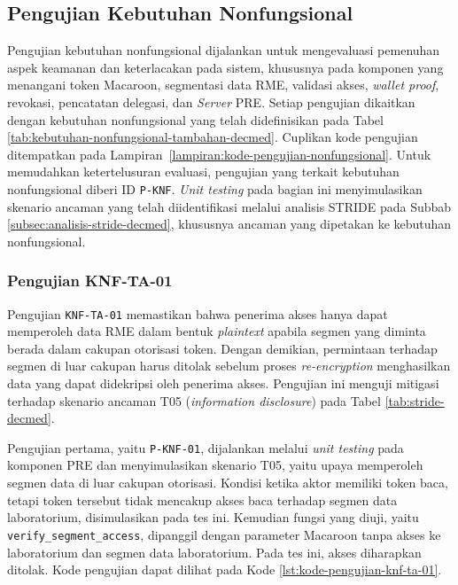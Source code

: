 \subsection{Pengujian Kebutuhan Nonfungsional}
\label{subsec:pengujian-kebutuhan-nonfungsional}

Pengujian kebutuhan nonfungsional dijalankan untuk mengevaluasi pemenuhan aspek keamanan dan keterlacakan pada sistem, khususnya pada komponen yang menangani token Macaroon, segmentasi data RME, validasi akses, \textit{wallet proof}, revokasi, pencatatan delegasi, dan \textit{Server} PRE. Setiap pengujian dikaitkan dengan kebutuhan nonfungsional yang telah didefinisikan pada Tabel \ref{tab:kebutuhan-nonfungsional-tambahan-decmed}. Cuplikan kode pengujian ditempatkan pada Lampiran~\ref{lampiran:kode-pengujian-nonfungsional}. Untuk memudahkan ketertelusuran evaluasi, pengujian yang terkait kebutuhan nonfungsional diberi ID \texttt{P-KNF}. \textit{Unit testing} pada bagian ini menyimulasikan skenario ancaman yang telah diidentifikasi melalui analisis STRIDE pada Subbab \ref{subsec:analisis-stride-decmed}, khususnya ancaman yang dipetakan ke kebutuhan nonfungsional.

\subsubsection{Pengujian KNF-TA-01}
\label{subsubsec:pengujian-knf-ta-01}

Pengujian \texttt{KNF-TA-01} memastikan bahwa penerima akses hanya dapat memperoleh data RME dalam bentuk \textit{plaintext} apabila segmen yang diminta berada dalam cakupan otorisasi token. Dengan demikian, permintaan terhadap segmen di luar cakupan harus ditolak sebelum proses \textit{re-encryption} menghasilkan data yang dapat didekripsi oleh penerima akses. Pengujian ini menguji mitigasi terhadap skenario ancaman T05 (\textit{information disclosure}) pada Tabel \ref{tab:stride-decmed}.

Pengujian pertama, yaitu \texttt{P-KNF-01}, dijalankan melalui \textit{unit testing} pada komponen PRE dan menyimulasikan skenario T05, yaitu upaya memperoleh segmen data di luar cakupan otorisasi. Kondisi ketika aktor memiliki token baca, tetapi token tersebut tidak mencakup akses baca terhadap segmen data laboratorium, disimulasikan pada tes ini. Kemudian fungsi yang diuji, yaitu \texttt{verify\_segment\_access}, dipanggil dengan parameter Macaroon tanpa akses ke laboratorium dan segmen data laboratorium. Pada tes ini, akses diharapkan ditolak. Kode pengujian dapat dilihat pada Kode \ref{lst:kode-pengujian-knf-ta-01}.

